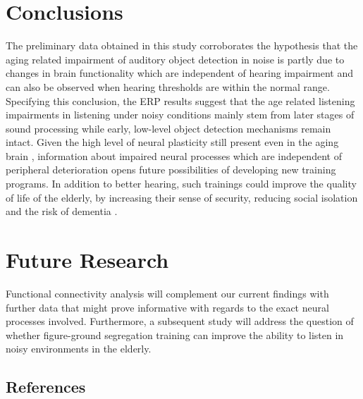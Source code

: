 \documentclass[a0,portrait]{a0poster}
\begin{document}
\begin{multicols}{2}

\section*{Conclusions}

The preliminary data obtained in this study corroborates the hypothesis that the aging related impairment of auditory object detection in noise is partly due to changes in brain functionality which are independent of hearing impairment and can also be observed when hearing thresholds are within the normal range. Specifying this conclusion, the ERP results suggest that the age related listening impairments in listening under noisy conditions mainly stem from later stages of sound processing while early, low-level object detection mechanisms remain intact. Given the high level of neural plasticity still present even in the aging brain \autocite{Grady2012}, information about impaired neural processes which are independent of peripheral deterioration opens future possibilities of developing new training programs. In addition to better hearing, such trainings could improve the quality of life of the elderly, by increasing their sense of security, reducing social isolation and the risk of dementia \autocite{Slade2020}.

\section*{Future Research}

Functional connectivity analysis will complement our current findings with further data that might prove informative with regards to the exact neural processes involved. Furthermore, a subsequent study will address the question of whether figure-ground segregation training can improve the ability to listen in noisy environments in the elderly.

\vspace{100pt}
\subsection*{References}
\AtNextBibliography{\tiny}
\printbibliography[heading=none]


\end{multicols}
\end{document}
